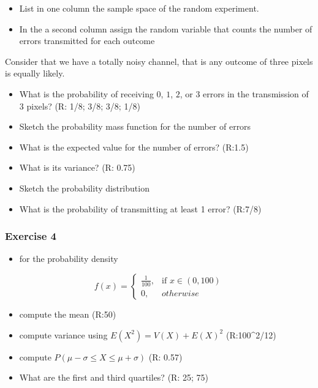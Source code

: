 \documentclass[
]{book}
\providecommand{\tightlist}{%
  \setlength{\itemsep}{0pt}\setlength{\parskip}{0pt}}
\begin{document}
\begin{itemize}
\item
  List in one column the sample space of the random experiment.
\item
  In the a second column assign the random variable that counts the number of errors transmitted for each outcome
\end{itemize}

Consider that we have a totally noisy channel, that is any outcome of three pixels is equally likely.

\begin{itemize}
\item
  What is the probability of receiving \(0\), \(1\), \(2\), or \(3\) errors in the transmission of \(3\) pixels? (R: 1/8; 3/8; 3/8; 1/8)
\item
  Sketch the probability mass function for the number of errors
\item
  What is the expected value for the number of errors? (R:1.5)
\item
  What is its variance? (R: 0.75)
\item
  Sketch the probability distribution
\item
  What is the probability of transmitting at least 1 error? (R:7/8)
\end{itemize}

\hypertarget{exercise-4-1}{%
\subsubsection{Exercise 4}\label{exercise-4-1}}

\begin{itemize}
\tightlist
\item
  for the probability density
\end{itemize}

\[
    f(x)= 
\begin{cases}
    \frac{1}{100},& \text{if } x\in (0,100)\\
    0,& otherwise 
\end{cases}
\]

\begin{itemize}
\tightlist
\item
  compute the mean (R:50)
\item
  compute variance using \(E(X^2)=V(X)+E(X)^2\) (R:100\^{}2/12)
\item
  compute \(P(\mu-\sigma\leq X \leq \mu+\sigma)\) (R: 0.57)
\item
  What are the first and third quartiles? (R: 25; 75)
\end{itemize}
\end{document}
